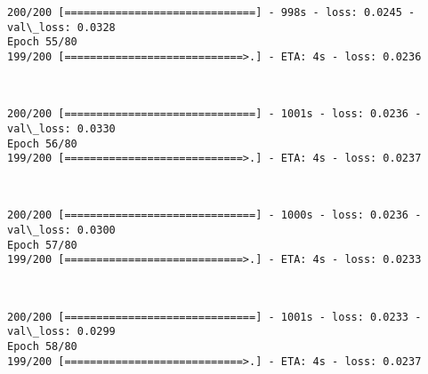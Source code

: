 \documentclass[11pt]{article}
\begin{document}
    \begin{Verbatim}[commandchars=\\\{\}]
200/200 [==============================] - 998s - loss: 0.0245 - val\_loss: 0.0328
Epoch 55/80
199/200 [============================>.] - ETA: 4s - loss: 0.0236
    \end{Verbatim}

    \begin{center}
    \end{center}
    { \hspace*{\fill} \\}
    
    \begin{Verbatim}[commandchars=\\\{\}]
200/200 [==============================] - 1001s - loss: 0.0236 - val\_loss: 0.0330
Epoch 56/80
199/200 [============================>.] - ETA: 4s - loss: 0.0237
    \end{Verbatim}

    \begin{center}
    \end{center}
    { \hspace*{\fill} \\}
    
    \begin{Verbatim}[commandchars=\\\{\}]
200/200 [==============================] - 1000s - loss: 0.0236 - val\_loss: 0.0300
Epoch 57/80
199/200 [============================>.] - ETA: 4s - loss: 0.0233
    \end{Verbatim}

    \begin{center}
    \end{center}
    { \hspace*{\fill} \\}
    
    \begin{Verbatim}[commandchars=\\\{\}]
200/200 [==============================] - 1001s - loss: 0.0233 - val\_loss: 0.0299
Epoch 58/80
199/200 [============================>.] - ETA: 4s - loss: 0.0237
    \end{Verbatim}

    \begin{center}
    \end{center}
    { \hspace*{\fill} \\}
    
\end{document}
